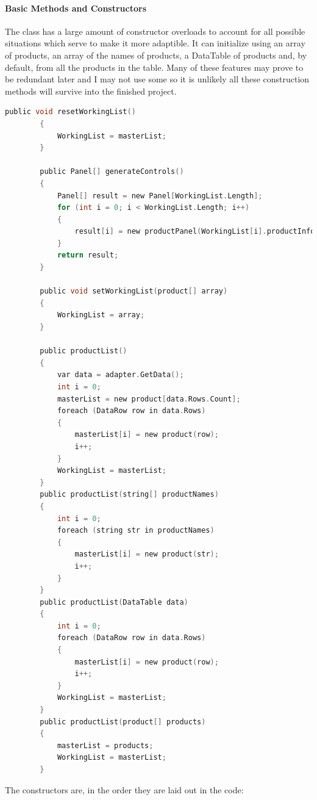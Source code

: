 ﻿\documentclass{article}
\begin{document}
    \paragraph{Basic Methods and Constructors}
    The class has a large amount of constructor overloads to account for all possible situations which serve to make it more adaptible.
    It can initialize using an array of products, an array of the names of products, a DataTable of products and, by default, from all the products in the table.
    Many of these features may prove to be redundant later and I may not use some so it is unlikely all these construction methods will survive into the finished project.
    \begin{lstlisting}[language=C]
		public void resetWorkingList()
		{
			WorkingList = masterList;
		}

		public Panel[] generateControls()
		{
			Panel[] result = new Panel[WorkingList.Length];
			for (int i = 0; i < WorkingList.Length; i++)
			{
				result[i] = new productPanel(WorkingList[i].productInfo);
			}
			return result;
		}

		public void setWorkingList(product[] array)
		{
			WorkingList = array;
		}

		public productList()
		{
			var data = adapter.GetData();
			int i = 0;
			masterList = new product[data.Rows.Count];
			foreach (DataRow row in data.Rows)
			{
				masterList[i] = new product(row);
				i++;
			}
			WorkingList = masterList;
		}
		public productList(string[] productNames)
		{
			int i = 0;
			foreach (string str in productNames)
			{
				masterList[i] = new product(str);
				i++;
			}
		}
		public productList(DataTable data)
		{
			int i = 0;
			foreach (DataRow row in data.Rows)
			{
				masterList[i] = new product(row);
				i++;
			}
			WorkingList = masterList;
		}
		public productList(product[] products)
		{
			masterList = products;
			WorkingList = masterList;
		}
    \end{lstlisting}
    The constructors are, in the order they are laid out in the code:
\end{document}
